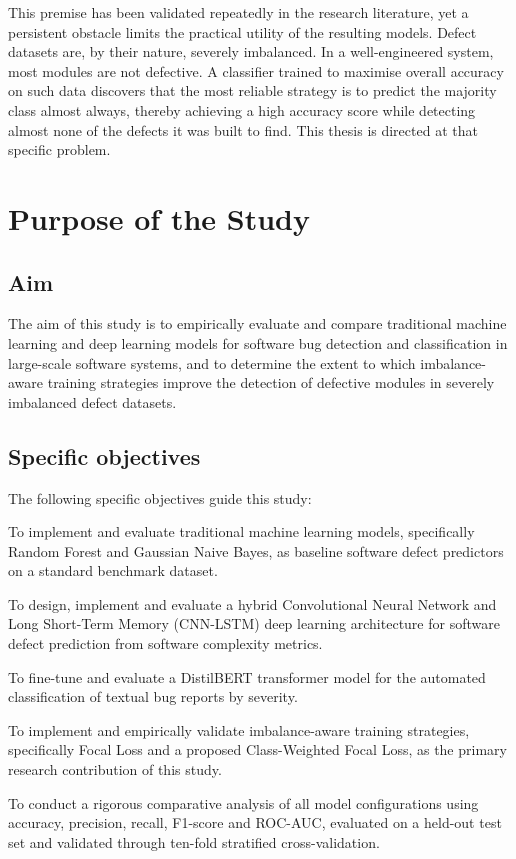\documentclass[12pt,a4paper,oneside]{report}
\begin{document}
This premise has been validated repeatedly in the research literature, yet a persistent obstacle limits the practical utility of the resulting models. Defect datasets are, by their nature, severely imbalanced. In a well-engineered system, most modules are not defective. A classifier trained to maximise overall accuracy on such data discovers that the most reliable strategy is to predict the majority class almost always, thereby achieving a high accuracy score while detecting almost none of the defects it was built to find. This thesis is directed at that specific problem.

\section{Purpose of the Study}

\subsection{Aim}

The aim of this study is to empirically evaluate and compare traditional machine learning and deep learning models for software bug detection and classification in large-scale software systems, and to determine the extent to which imbalance-aware training strategies improve the detection of defective modules in severely imbalanced defect datasets.

\subsection{Specific objectives}

The following specific objectives guide this study:

\begin{description}[leftmargin=3em,style=nextline,itemsep=4pt]
  \item[Objective 1:] To implement and evaluate traditional machine learning models, specifically Random Forest and Gaussian Naive Bayes, as baseline software defect predictors on a standard benchmark dataset.
  \item[Objective 2:] To design, implement and evaluate a hybrid Convolutional Neural Network and Long Short-Term Memory (CNN-LSTM) deep learning architecture for software defect prediction from software complexity metrics.
  \item[Objective 3:] To fine-tune and evaluate a DistilBERT transformer model for the automated classification of textual bug reports by severity.
  \item[Objective 4:] To implement and empirically validate imbalance-aware training strategies, specifically Focal Loss and a proposed Class-Weighted Focal Loss, as the primary research contribution of this study.
  \item[Objective 5:] To conduct a rigorous comparative analysis of all model configurations using accuracy, precision, recall, F1-score and ROC-AUC, evaluated on a held-out test set and validated through ten-fold stratified cross-validation.
\end{description}
\end{document}
